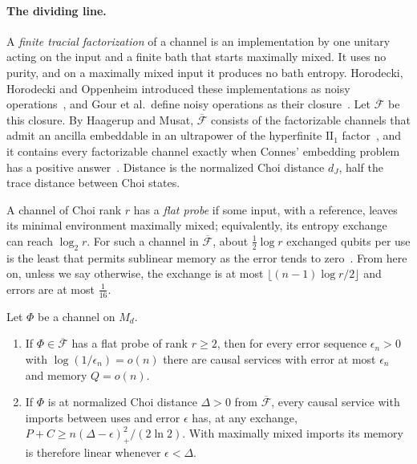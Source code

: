 \paragraph{The dividing line.}
A \emph{finite tracial factorization} of a channel is an implementation
by one unitary acting on the input and a finite bath that starts
maximally mixed. It uses no purity, and on a maximally mixed input it
produces no bath entropy. Horodecki, Horodecki and Oppenheim introduced
these implementations as noisy
operations~\cite{HorodeckiHorodeckiOppenheim2003}, and Gour et al.\
define noisy operations as their closure~\cite{GourEtAl2015}. Let
$\overline{\mathcal F}$ be this closure. By Haagerup and Musat,
$\overline{\mathcal F}$ consists of the factorizable channels that admit
an ancilla embeddable in an ultrapower of the hyperfinite
$\mathrm{II}_1$ factor~\cite[Theorem~3.6]{HaagerupMusat2015}, and it
contains every factorizable channel exactly when Connes' embedding
problem has a positive answer~\cite[Theorem~3.7]{HaagerupMusat2015}.
Distance is the normalized Choi distance $d_J$, half the trace distance
between Choi states.

A channel of Choi rank $r$ has a \emph{flat probe} if some input, with a
reference, leaves its minimal environment maximally mixed; equivalently,
its entropy exchange~\cite{Schumacher1996} can reach $\log_2 r$. For such
a channel in $\overline{\mathcal F}$, about $\frac12\log r$ exchanged
qubits per use is the least that permits sublinear memory as the error
tends to zero~\cite[Theorem~3.4]{DouglasMghirbiB}. From here on, unless
we say otherwise, the exchange is at most $\lfloor(n-1)\log r/2\rfloor$
and errors are at most $\frac1{16}$.

\begin{introthm}[Theorem~\ref{thm:closure-law}]\label{thm:intro-closure}
Let $\Phi$ be a channel on $M_d$.
\begin{enumerate}[label=(\alph*),itemsep=1pt]
\item If $\Phi\in\overline{\mathcal F}$ has a flat probe of rank
$r\geq2$, then for every error sequence $\epsilon_n>0$ with
$\log(1/\epsilon_n)=o(n)$ there are causal services with error at most
$\epsilon_n$ and memory $Q=o(n)$.
\item \cite[Theorem~3.2(b)]{DouglasMghirbiB} If $\Phi$ is at normalized
Choi distance $\Delta>0$ from $\overline{\mathcal F}$, every causal
service with imports between uses and error $\epsilon$ has, at any
exchange, $P+C\geq{n(\Delta-\epsilon)_+^2/(2\ln2)}$. With maximally
mixed imports its memory is therefore linear whenever $\epsilon<\Delta$.
\end{enumerate}
\end{introthm}

